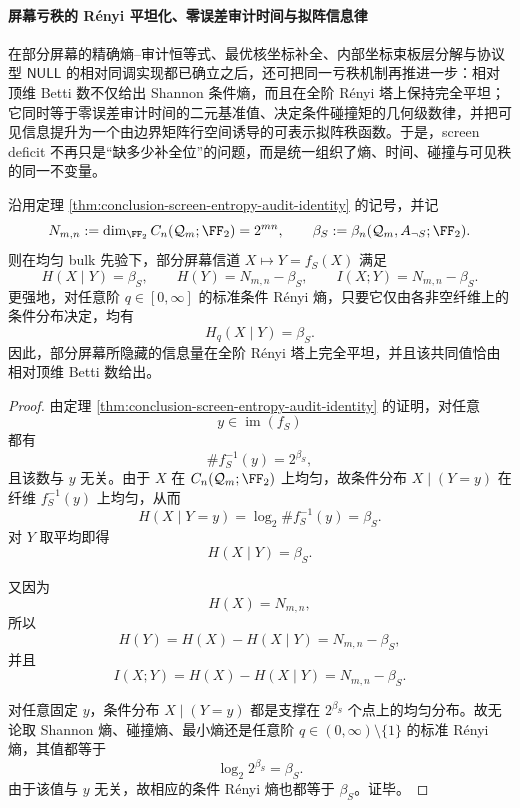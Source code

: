 \paragraph{屏幕亏秩的 R\'enyi 平坦化、零误差审计时间与拟阵信息律}
在部分屏幕的精确熵--审计恒等式、最优核坐标补全、内部坐标束板层分解与协议型 \(\mathsf{NULL}\) 的相对同调实现都已确立之后，还可把同一亏秩机制再推进一步：相对顶维 Betti 数不仅给出 Shannon 条件熵，而且在全阶 R\'enyi 塔上保持完全平坦；它同时等于零误差审计时间的二元基准值、决定条件碰撞矩的几何级数律，并把可见信息提升为一个由边界矩阵行空间诱导的可表示拟阵秩函数。于是，screen deficit 不再只是“缺多少补全位”的问题，而是统一组织了熵、时间、碰撞与可见秩的同一不变量。

\begin{theorem}\label{thm:conclusion-relative-betti-renyi-flatness}
沿用定理 \ref{thm:conclusion-screen-entropy-audit-identity} 的记号，并记
\[
N_{m,n}:=\dim_{\FF_2}C_n(\mathcal Q_m;\FF_2)=2^{mn},
\qquad
\beta_S:=\beta_n(\mathcal Q_m,A_{\neg S};\FF_2).
\]
则在均匀 bulk 先验下，部分屏幕信道 \(X\mapsto Y=f_S(X)\) 满足
\[
H(X\mid Y)=\beta_S,
\qquad
H(Y)=N_{m,n}-\beta_S,
\qquad
I(X;Y)=N_{m,n}-\beta_S.
\]
更强地，对任意阶 \(q\in [0,\infty]\) 的标准条件 R\'enyi 熵，只要它仅由各非空纤维上的条件分布决定，均有
\[
H_q(X\mid Y)=\beta_S.
\]
因此，部分屏幕所隐藏的信息量在全阶 R\'enyi 塔上完全平坦，并且该共同值恰由相对顶维 Betti 数给出。
\end{theorem}

\begin{proof}
由定理 \ref{thm:conclusion-screen-entropy-audit-identity} 的证明，对任意
\[
y\in \operatorname{im}(f_S)
\]
都有
\[
\#f_S^{-1}(y)=2^{\beta_S},
\]
且该数与 \(y\) 无关。由于 \(X\) 在 \(C_n(\mathcal Q_m;\FF_2)\) 上均匀，故条件分布 \(X\mid(Y=y)\) 在纤维 \(f_S^{-1}(y)\) 上均匀，从而
\[
H(X\mid Y=y)=\log_2\#f_S^{-1}(y)=\beta_S.
\]
对 \(Y\) 取平均即得
\[
H(X\mid Y)=\beta_S.
\]

又因为
\[
H(X)=N_{m,n},
\]
所以
\[
H(Y)=H(X)-H(X\mid Y)=N_{m,n}-\beta_S,
\]
并且
\[
I(X;Y)=H(X)-H(X\mid Y)=N_{m,n}-\beta_S.
\]

对任意固定 \(y\)，条件分布 \(X\mid(Y=y)\) 都是支撑在 \(2^{\beta_S}\) 个点上的均匀分布。故无论取 Shannon 熵、碰撞熵、最小熵还是任意阶 \(q\in(0,\infty)\setminus\{1\}\) 的标准 R\'enyi 熵，其值都等于
\[
\log_2 2^{\beta_S}=\beta_S.
\]
由于该值与 \(y\) 无关，故相应的条件 R\'enyi 熵也都等于 \(\beta_S\)。证毕。
\end{proof}

